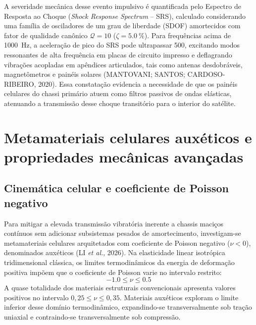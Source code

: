 A severidade mecânica desse evento impulsivo é quantificada pelo Espectro de Resposta ao Choque (\textit{Shock Response Spectrum} -- SRS), calculado considerando uma família de osciladores de um grau de liberdade (SDOF) amortecidos com fator de qualidade canônico $\mathcal{Q} = 10$ ($\zeta = \SI{5.0}{\percent}$). Para frequências acima de \SI{1000}{\hertz}, a aceleração de pico do SRS pode ultrapassar \SI{500}{\gacc}, excitando modos ressonantes de alta frequência em placas de circuito impresso e deflagrando vibrações acopladas em apêndices articulados, tais como antenas desdobráveis, magnetômetros e painéis solares (MANTOVANI; SANTOS; CARDOSO-RIBEIRO, 2020). Essa constatação evidencia a necessidade de que os painéis celulares do chassi primário atuem como filtros passivos de ondas elásticas, atenuando a transmissão desse choque transitório para o interior do satélite.

\section{Metamateriais celulares auxéticos e propriedades mecânicas avançadas}
\label{sec:auxeticos-teoria}

\subsection{Cinemática celular e coeficiente de Poisson negativo}
\label{subsec:poisson-negativo}

Para mitigar a elevada transmissão vibratória inerente a chassis maciços contínuos sem adicionar subsistemas pesados de amortecimento, investigam-se metamateriais celulares arquitetados com coeficiente de Poisson negativo ($\nu < 0$), denominados auxéticos (LI \textit{et al.}, 2026). Na elasticidade linear isotrópica tridimensional clássica, os limites termodinâmicos da energia de deformação positiva impõem que o coeficiente de Poisson varie no intervalo restrito:
\begin{equation}
  -1.0 \le \nu \le 0.5
  \label{eq:limites-poisson}
\end{equation}
A quase totalidade dos materiais estruturais convencionais apresenta valores positivos no intervalo $0{,}25 \le \nu \le 0{,}35$. Materiais auxéticos exploram o limite inferior desse domínio termodinâmico, expandindo-se transversalmente sob tração uniaxial e contraindo-se transversalmente sob compressão.


